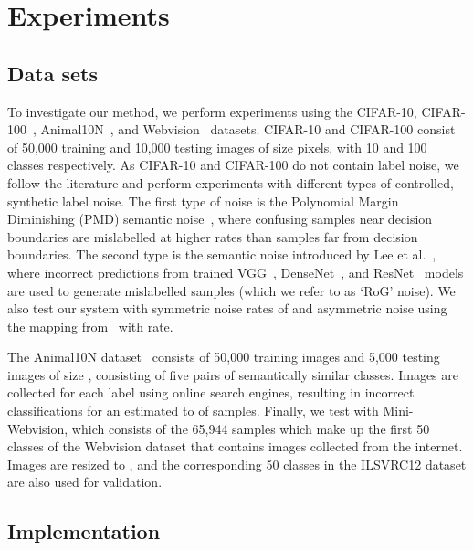 \documentclass[10pt,twocolumn,letterpaper]{article}
\begin{document}
\section{Experiments}


\subsection{Data sets}

To investigate our method, we perform experiments using the CIFAR-10, CIFAR-100~\cite{krizhevsky2009learning}, Animal10N~\cite{song2019selfie}, 
and Webvision~\cite{li2017webvision} datasets.
CIFAR-10 and CIFAR-100 consist of 50,000 training and 10,000 testing images of size  pixels, with 10 and 100 classes respectively. As CIFAR-10 and CIFAR-100 do not contain label noise, we follow the literature and perform experiments with different types of controlled, synthetic label noise. The first type of noise is the Polynomial Margin Diminishing (PMD) semantic noise~\cite{zhang2020learning}, where confusing samples near decision boundaries are mislabelled at higher rates than samples far from decision boundaries. The second type is the semantic noise introduced by Lee et al.~\cite{lee2019robust}, where incorrect predictions from trained VGG~\citep{simonyan2014very}, DenseNet~\cite{huang2017densely}, and ResNet~\cite{he2016identity} models are used to generate mislabelled samples (which we refer to as `RoG' noise). We also test our system with symmetric noise rates of  and asymmetric noise using the mapping from~\citep{li2020dividemix, patrini2017making} with  rate.

The Animal10N dataset~\cite{song2019selfie} consists of 50,000 training images and 5,000 testing images of size , consisting of five pairs of semantically similar classes. Images are collected for each label using online search engines, resulting in incorrect classifications for an estimated  to  of samples.
Finally, we test with Mini-Webvision, which consists of the 65,944 samples which make up the first 50 classes of the Webvision dataset that contains images collected from the internet. Images are resized to , and the corresponding 50 classes in the ILSVRC12 dataset \cite{deng2009imagenet} are also used for validation.

\subsection{Implementation}
\end{document}
